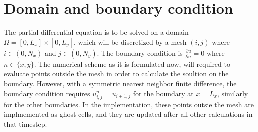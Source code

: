 \documentclass[a4paper]{article}
\begin{document}
\section{Domain and boundary condition}
The partial differential equation is to be solved on a domain $\Omega = [0, L_x] \times [0, L_y]$, which will be discretized by a mesh $(i, j)$ where $i \in (0, N_x)$ and $j \in (0, N_y)$.
The boundary condition is $\frac{\partial u}{\partial n} = 0$ where $n \in \{x, y\}$. The numerical scheme as it is formulated now, will required to evaluate points outside the mesh in order to calculate the soultion on the boundary. However, with a symmetric nearest neighbor finite difference, the boundary condition requires $u_{i, j}^n = u_{i+1, j}$ for the boundary at $x = L_x$, similarly for the other boundaries.
In the implementation, these points outsie the mesh are implmemented as ghost cells, and they are updated after all other calculations in that timestep.  
\end{document}
